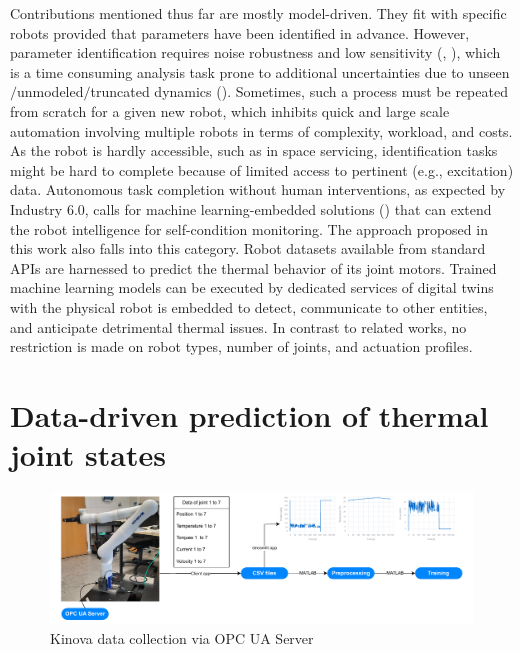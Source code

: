 \documentclass{ifacconf}
\begin{document}
Contributions mentioned thus far are mostly model-driven. They fit  with specific robots provided that parameters have been  identified in advance. However, parameter identification requires   noise robustness and low  sensitivity (\cite{zhang2024model}, \cite{de2024non}), which is a time consuming analysis task  prone to additional uncertainties due to unseen$\slash$unmodeled$\slash$truncated dynamics (\cite{shang2024general}). Sometimes, such a process must  be repeated from scratch for a given new robot, which inhibits quick and large scale automation involving multiple robots in terms of complexity, workload, and costs. As the robot is hardly accessible, such as in space servicing,  identification tasks might be hard to complete because of limited access to pertinent (e.g., excitation) data. Autonomous task completion without human interventions, as expected by Industry 6.0, calls for machine learning-embedded solutions (\cite{carayannis2024toward}) that can extend the robot intelligence for self-condition monitoring. The approach proposed in this work also falls into this category. Robot datasets available from standard APIs are harnessed to predict the thermal behavior of its joint motors. Trained machine learning models can be executed by dedicated services of  digital twins with the physical robot is embedded to detect, communicate to other entities, and anticipate  detrimental thermal issues. In contrast to related works, no restriction is made  on  robot types, number of joints, and actuation profiles.

\section{Data-driven prediction of  thermal joint states}

\begin{figure}
  \begin{center}
    \includegraphics[width=\textwidth]{pictures/DataAquisition.drawio.pdf} 
    \caption{Kinova data collection via OPC UA Server} 
    \label{fig:DataAquisition}
  \end{center}
\end{figure}
\end{document}
